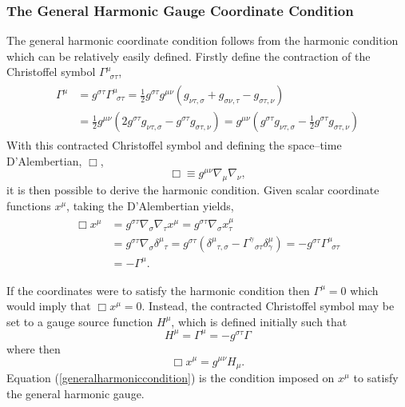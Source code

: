 \documentclass[11pt]{article}
\newcommand{\blank}{\enspace}
\newcommand{\blankt}{\text{ }}
\numberwithin{equation}{section}
\begin{document}
\subsubsection{The General Harmonic Gauge Coordinate Condition}
The general harmonic coordinate condition follows from the harmonic condition which can be relatively easily defined.
Firstly define the contraction of the Christoffel symbol $\Gamma^{\mu}_{\blank\sigma\tau}$,
\begin{align}\label{contractedchristoffel}
\begin{split}
    \Gamma^{\mu} &= g^{\sigma\tau}\Gamma^{\mu}_{\blank\sigma\tau} =\frac12g^{\sigma\tau}g^{\mu\nu}(g_{\nu\tau,\sigma} + g_{\sigma\nu,\tau} - g_{\sigma\tau,\nu}) \\
    &= \frac12g^{\mu\nu}(2g^{\sigma\tau}g_{\nu\tau,\sigma} - g^{\sigma\tau}g_{\sigma\tau,\nu}) = g^{\mu\nu}\left(g^{\sigma\tau}g_{\nu\tau,\sigma} - \frac12g^{\sigma\tau}g_{\sigma\tau,\nu}\right)
\end{split}
\end{align}
With this contracted Christoffel symbol and defining the space--time D'Alembertian, $\Box$,
\begin{equation}
    \Box \equiv g^{\mu\nu}\nabla_{\mu}\nabla_{\nu},
\end{equation}
it is then possible to derive the harmonic condition. Given scalar coordinate functions $x^{\mu}$, taking the D'Alembertian yields,
\begin{align}\label{harmoniccondition}
\begin{split}
    \Box x^{\mu} &= g^{\sigma\tau}\nabla_{\sigma}\nabla_{\tau}x^{\mu} = g^{\sigma\tau}\nabla_{\sigma}x^{\mu}_{\tau} \\
    &= g^{\sigma\tau}\nabla_{\sigma}\delta^{\mu}_{\blankt\tau} = g^{\sigma\tau}(\delta^{\mu}_{\blankt\tau,\sigma} - \Gamma^{\gamma}_{\blankt\sigma\tau}\delta^{\mu}_{\gamma}) = -g^{\sigma\tau}\Gamma^{\mu}_{\blank\sigma\tau} \\
    &= -\Gamma^{\mu}.
\end{split}
\end{align}

If the coordinates were to satisfy the harmonic condition then $\Gamma^{\mu} = 0$ which would imply that $\Box x^{\mu} = 0$. Instead, the contracted Christoffel symbol may be set to a gauge source function $H^{\mu}$, which is defined initially such that
\begin{equation}
    H^{\mu} = \Gamma^{\mu} = -g^{\sigma\tau}\Gamma
\end{equation}
where then
\begin{equation} \label{generalharmoniccondition}
    \Box x^{\mu} = g^{\mu\nu}H_{\mu}.
\end{equation}
Equation (\ref{generalharmoniccondition}) is the condition imposed on $x^{\mu}$ to satisfy the general harmonic gauge. 
\end{document}
